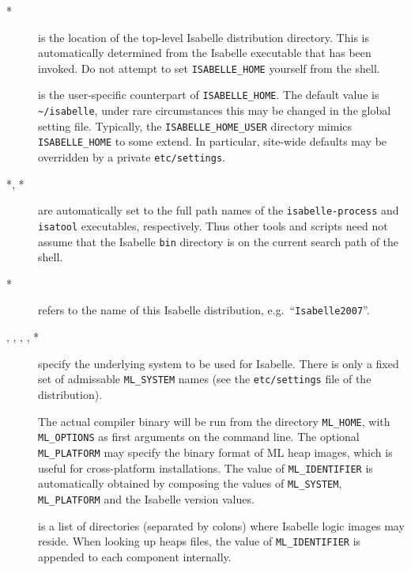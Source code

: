 \begin{description}
\item[*] is the location of the top-level Isabelle
  distribution directory. This is automatically determined from the Isabelle
  executable that has been invoked.  Do not attempt to set
  \texttt{ISABELLE_HOME} yourself from the shell.
  
\item[] is the user-specific counterpart of
  \texttt{ISABELLE_HOME}. The default value is \texttt{\~\relax/isabelle},
  under rare circumstances this may be changed in the global setting file.
  Typically, the \texttt{ISABELLE_HOME_USER} directory mimics
  \texttt{ISABELLE_HOME} to some extend. In particular, site-wide defaults may
  be overridden by a private \texttt{etc/settings}.
  
\item[*, *] are automatically set to the full
  path names of the \texttt{isabelle-process} and \texttt{isatool}
  executables, respectively.  Thus other tools and scripts need not assume
  that the Isabelle \texttt{bin} directory is on the current search path of
  the shell.
  
\item[*] refers to the name of this
  Isabelle distribution, e.g.\ ``\texttt{Isabelle2007}''.

\item[, , ,
  , *] specify the underlying {\ML}
  system to be used for Isabelle.  There is only a fixed set of admissable
  \texttt{ML_SYSTEM} names (see the \texttt{etc/settings} file of the
  distribution).
  
  The actual compiler binary will be run from the directory \texttt{ML_HOME},
  with \texttt{ML_OPTIONS} as first arguments on the command line.  The
  optional \texttt{ML_PLATFORM} may specify the binary format of ML heap
  images, which is useful for cross-platform installations.  The value of
  \texttt{ML_IDENTIFIER} is automatically obtained by composing the values of
  \texttt{ML_SYSTEM}, \texttt{ML_PLATFORM} and the Isabelle version values.
  
\item[] is a list of directories (separated by colons)
  where Isabelle logic images may reside.  When looking up heaps files, the
  value of \texttt{ML_IDENTIFIER} is appended to each component internally.
  

\end{description}
